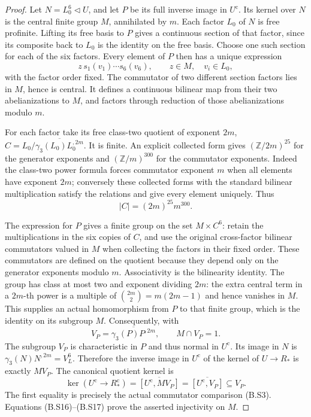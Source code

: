 \begin{proof}
Let $N=L_0^6\triangleleft U$, and let $P$ be its full
inverse image in $U^{\mathrm c}$.  Its kernel over $N$
is the central finite group $M$, annihilated by $m$.
Each factor $L_0$ of $N$ is free profinite.  Lifting its
free basis to $P$ gives a continuous section of that
factor, since its composite back to $L_0$ is the identity
on the free basis.  Choose one such section for each of
the six factors.  Every element of $P$ then has a unique
expression
\[
                 z\,s_1(v_1)\cdots s_6(v_6),
                 \qquad z\in M,\quad v_i\in L_0,
\]
with the factor order fixed.  The commutator of two
different section factors lies in $M$, hence is central.
It defines a continuous bilinear map from their two
abelianizations to $M$, and factors through reduction
of those abelianizations modulo $m$.

For each factor take its free class-two quotient of
exponent $2m$,
$C=L_0/\overline{\gamma_3(L_0)L_0^{,2m}}$.
It is finite.  An explicit collected form gives
$(\mathbb Z/2m)^{25}$ for the generator exponents and
$(\mathbb Z/m)^{300}$ for the commutator exponents.
Indeed the class-two power formula forces commutator
exponent $m$ when all elements have exponent $2m$;
conversely these collected forms with the standard
bilinear multiplication satisfy the relations and
give every element uniquely.  Thus
\[
                         |C|=(2m)^{25}m^{300}.                 \tag{B.S15}
\]

The expression for $P$ gives a finite group on the set
$M\times C^6$: retain the multiplications in the six
copies of $C$, and use the original cross-factor
bilinear commutators valued in $M$ when collecting
the factors in their fixed order.  These commutators
are defined on the quotient because they depend only
on the generator exponents modulo $m$.  Associativity
is the bilinearity identity.  The group has class at
most two and exponent dividing $2m$: the extra central
term in a $2m$-th power is a multiple of
$\binom{2m}{2}=m(2m-1)$ and hence vanishes in $M$.
This supplies an actual homomorphism from $P$ to that
finite group, which is the identity on its subgroup $M$.
Consequently, with
\[
               V_P=\overline{\gamma_3(P)P^{,2m}},
               \qquad M\cap V_P=1.                            \tag{B.S16}
\]
The subgroup $V_P$ is characteristic in $P$ and thus
normal in $U^{\mathrm c}$.  Its image in $N$ is
$\gamma_3(N)N^{,2m}=V_L^6$.  Therefore the inverse
image in $U^{\mathrm c}$ of the kernel of $U\to R_*$
is exactly $MV_P$.  The canonical quotient kernel is
\[
 \ker(U^{\mathrm c}\longrightarrow R_*^{\mathrm c})
       =\overline{[U^{\mathrm c},MV_P]}
       =\overline{[U^{\mathrm c},V_P]}\subseteq V_P.             \tag{B.S17}
\]
The first equality is precisely the actual commutator
comparison (B.S3).  Equations (B.S16)--(B.S17) prove
the asserted injectivity on $M$.


\end{proof}
